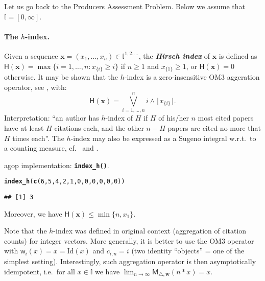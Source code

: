 \documentclass[11pt]{article}\usepackage[]{graphicx}\usepackage[]{color}
\makeatletter
\newcommand{\hlnum}[1]{\textcolor[rgb]{0.686,0.059,0.569}{#1}}%
\newcommand{\hlstd}[1]{\textcolor[rgb]{0.345,0.345,0.345}{#1}}%
\newcommand{\hlkwd}[1]{\textcolor[rgb]{0.737,0.353,0.396}{\textbf{#1}}}%
\newenvironment{kframe}{%
 \def\at@end@of@kframe{}%
 \ifinner\ifhmode%
  \def\at@end@of@kframe{\end{minipage}}%
  \begin{minipage}{\columnwidth}%
 \fi\fi%
 \def\FrameCommand##1{\hskip\@totalleftmargin \hskip-\fboxsep
 \colorbox{shadecolor}{##1}\hskip-\fboxsep
     \hskip-\linewidth \hskip-\@totalleftmargin \hskip\columnwidth}%
 \MakeFramed {\advance\hsize-\width
   \@totalleftmargin\z@ \linewidth\hsize
   \@setminipage}}%
 {\par\unskip\endMakeFramed%
 \at@end@of@kframe}
\newenvironment{knitrout}{}{} %
\renewcommand{\emph}[1]{\textbf{\textsl{#1}}}
\newcommand{\package}[1]{\textsf{#1}\xspace}
\newcommand{\Rfunc}[1]{\texttt{\hlkwd{#1}}}
\newcommand{\vect}[1]{{\mathbf{#1}}}
\newcommand{\func}[1]{{\mathsf{#1}}}
\newcommand{\Ival}{\mathbb{I}}
\newcommand{\AnyPow}{^{1,2,\dots}}
\newcommand{\IvalAnyPow}{\mathbb{I}\AnyPow}
\theoremstyle{remark}
\theoremstyle{definition}
\makeatother
\begin{document}
Let us go back to the Producers Assessment Problem.
Below we assume that $\Ival=[0,\infty]$.


\paragraph{The $h$-index.}
Given a sequence $\vect{x}=(x_1,\dots,x_n)\in\IvalAnyPow$,
the \emph{Hirsch index} \cite{Hirsch2005:hindex} of $\vect{x}$ is defined as
$\func{H}(\vect{x})=\max\{i=1,\dots,n: x_{\{i\}} \ge i\}$
if $n \ge 1$ and $x_{\{1\}} \ge 1$, or $\func{H}(\vect{x})=0$ otherwise.
It may be shown that the $h$-index is a zero-insensitive
OM3 aggeration operator,
see \cite{Gagolewski2013:om3}, with:
\[
   \func{H}(\vect{x}) = \bigvee_{i=1,\dots,n}^n i\wedge \lfloor x_{\{i\}}\rfloor.
\]
Interpretation: ``an author has $h$-index of $H$ if $H$ of his/her
$n$ most cited papers have at least $H$ citations each, and the other $n-H$
papers are cited no more that $H$ times each''.
The $h$-index may also be expressed as a Sugeno
integral \cite{Sugeno1974:PhD}
w.r.t.~to a counting measure, cf.~\cite{TorraNarukawa2008:h2fuzzyintegrals}
and \cite{GagolewskiMesiar2014:integrals}.

\smallskip
\noindent
\package{agop} implementation: \index{\Rfunc{index\_h()}}\Rfunc{index\_h()}.

\begin{knitrout}\small
{}\color{fgcolor}\begin{kframe}
\begin{alltt}
\hlkwd{index_h}\hlstd{(}\hlkwd{c}\hlstd{(}\hlnum{6}\hlstd{,}\hlnum{5}\hlstd{,}\hlnum{4}\hlstd{,}\hlnum{2}\hlstd{,}\hlnum{1}\hlstd{,}\hlnum{0}\hlstd{,}\hlnum{0}\hlstd{,}\hlnum{0}\hlstd{,}\hlnum{0}\hlstd{,}\hlnum{0}\hlstd{,}\hlnum{0}\hlstd{))}
\end{alltt}
\begin{verbatim}
## [1] 3
\end{verbatim}
\end{kframe}
\end{knitrout}

Moreover, we have $\func{H}(\vect{x})\le \min\{n, x_{1}\}$.

Note that the $h$-index was defined in original context (aggregation
of citation counts) for integer vectors. More generally,
it is better to use the OM3 operator
with $\func{w}_i(x)=x=\mathrm{Id}(x)$
and $c_{i,n}=i$ (two identity ``objects'' = one of the simplest
setting).
Interestingly, such aggregation operator is then
asymptotically idempotent, i.e.~for all $x\in\Ival$
we have $\lim_{n\to\infty} \func{M}_{\triangle,\vect{w}}(n\ast x)=x$.
\end{document}
